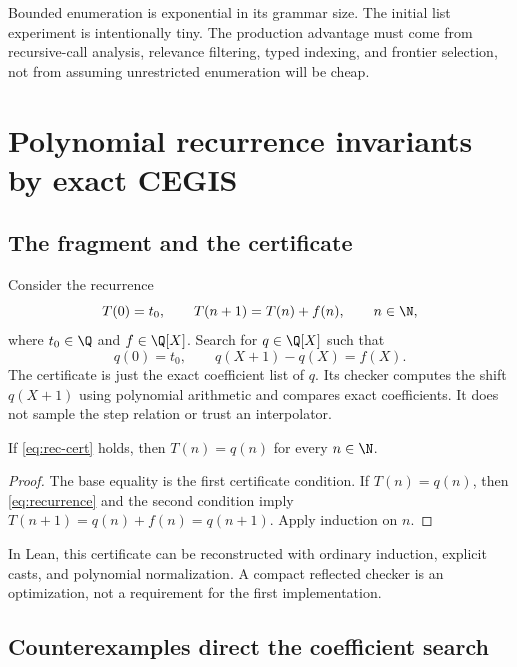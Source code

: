 Bounded enumeration is exponential in its grammar size. The initial list
experiment is intentionally tiny. The production advantage must come from
recursive-call analysis, relevance filtering, typed indexing, and frontier
selection, not from assuming unrestricted enumeration will be cheap.

\section{Polynomial recurrence invariants by exact CEGIS}

\subsection{The fragment and the certificate}

Consider the recurrence
\begin{equation}\label{eq:recurrence}
T(0)=t_0,\qquad T(n+1)=T(n)+f(n),\qquad n\in\N,
\end{equation}
where $t_0\in\Q$ and $f\in\Q[X]$. Search for $q\in\Q[X]$ such that
\begin{equation}\label{eq:rec-cert}
q(0)=t_0,\qquad q(X+1)-q(X)=f(X).
\end{equation}
The certificate is just the exact coefficient list of $q$. Its checker
computes the shift $q(X+1)$ using polynomial arithmetic and compares exact
coefficients. It does not sample the step relation or trust an interpolator.

\begin{proposition}
If \eqref{eq:rec-cert} holds, then $T(n)=q(n)$ for every $n\in\N$.
\end{proposition}
\begin{proof}
The base equality is the first certificate condition. If $T(n)=q(n)$, then
\eqref{eq:recurrence} and the second condition imply
$T(n+1)=q(n)+f(n)=q(n+1)$. Apply induction on $n$.
\end{proof}

In Lean, this certificate can be reconstructed with ordinary induction,
explicit casts, and polynomial normalization. A compact reflected checker is
an optimization, not a requirement for the first implementation.

\subsection{Counterexamples direct the coefficient search}

